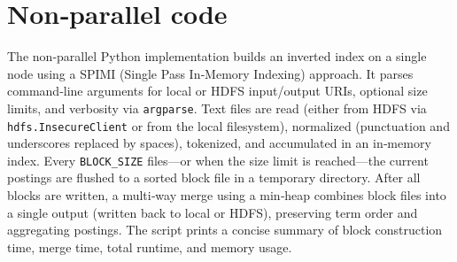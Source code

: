 \section{Non‑parallel code}
The non‑parallel Python implementation builds an inverted index on a single node using a SPIMI (Single Pass In‑Memory Indexing) approach. It parses command‑line arguments for local or HDFS input/output URIs, optional size limits, and verbosity via \texttt{argparse}. Text files are read (either from HDFS via \texttt{hdfs.InsecureClient} or from the local filesystem), normalized (punctuation and underscores replaced by spaces), tokenized, and accumulated in an in‑memory index. Every \texttt{BLOCK\_SIZE} files—or when the size limit is reached—the current postings are flushed to a sorted block file in a temporary directory.  
After all blocks are written, a multi‑way merge using a min‑heap combines block files into a single output (written back to local or HDFS), preserving term order and aggregating postings. The script prints a concise summary of block construction time, merge time, total runtime, and memory usage.  
